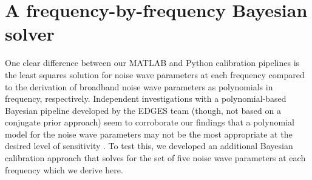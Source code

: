 \section{A frequency-by-frequency Bayesian solver}
\label{sec:fbf}

One clear difference between our MATLAB and Python calibration pipelines is the least squares solution for noise wave parameters at each frequency compared to the derivation of broadband noise wave parameters as polynomials in frequency, respectively. Independent investigations with a polynomial-based Bayesian pipeline developed by the EDGES team (though, not based on a conjugate prior approach) seem to corroborate our findings that a polynomial model for the noise wave parameters may not be the most appropriate at the desired level of sensitivity \citep{murray_calpap}. To test this, we developed an additional Bayesian calibration approach that solves for the set of five noise wave parameters at each frequency which we derive here.

